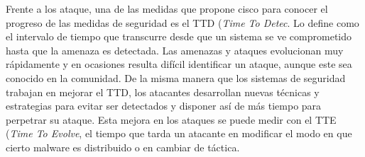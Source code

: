 Frente a los ataque, una de las medidas que propone cisco para conocer el progreso de las medidas de seguridad es el TTD (\textit{Time To Detec}. Lo define como el intervalo de tiempo que transcurre desde que un sistema se ve comprometido hasta que la amenaza es detectada. Las amenazas y ataques evolucionan muy rápidamente y en ocasiones resulta difícil identificar un ataque, aunque este sea conocido en la comunidad. De la misma manera que los sistemas de seguridad trabajan en mejorar el TTD, los atacantes desarrollan nuevas técnicas y estrategias para evitar ser detectados y disponer así de más tiempo  para perpetrar su ataque. Esta mejora en los ataques se puede medir con el TTE (\textit{Time To Evolve}, el tiempo que tarda un atacante en modificar el modo en que cierto malware es distribuido o en cambiar de táctica.  


